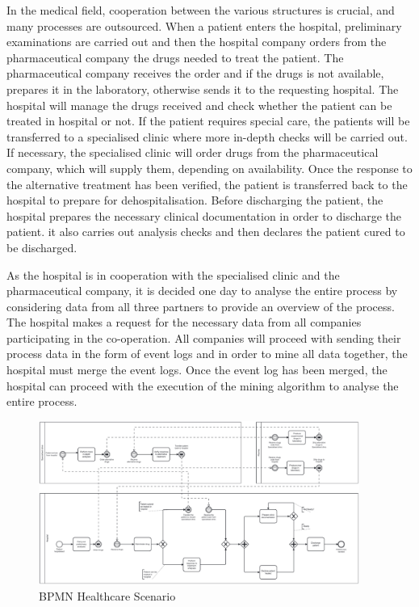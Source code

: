 
In the medical field, cooperation between the various structures is crucial, and many processes are outsourced. 
When a patient enters the hospital, preliminary examinations are carried out and then the hospital company orders from the pharmaceutical company the drugs needed to treat the patient. The pharmaceutical company receives the order and if the drugs is not available, prepares it in the laboratory, otherwise sends it to the requesting hospital. The hospital will manage the drugs received and check whether the patient can be treated in hospital or not. If the patient requires special care, the patients will be transferred to a specialised clinic where more in-depth checks will be carried out. If necessary, the specialised clinic will order drugs from the pharmaceutical company, which will supply them, depending on availability. Once the response to the alternative treatment has been verified, the patient is transferred back to the hospital to prepare for dehospitalisation. Before discharging the patient, the hospital prepares the necessary clinical documentation in order to discharge the patient. it also carries out analysis checks and then declares the patient cured to be discharged.

As the hospital is in cooperation with the specialised clinic and the pharmaceutical company, it is decided one day to analyse the entire process by considering data from all three partners to provide an overview of the process. The hospital makes a request for the necessary data from all companies participating in the co-operation. All companies will proceed with sending their process data in the form of event logs and in order to mine all data together, the hospital must merge the event logs. Once the event log has been merged, the hospital can proceed with the execution of the mining algorithm to analyse the entire process.


\begin{figure}[t]
\centering
\includegraphics[width=10.5cm]{content/figures/healthcare_scenario.pdf}
\caption{BPMN Healthcare Scenario}
\label{fig:sequence_diagram}
\end{figure}